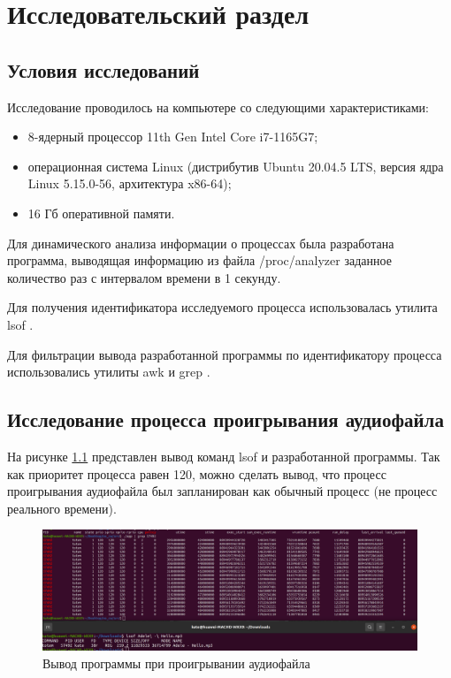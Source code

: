 \chapter{Исследовательский раздел}
\section{Условия исследований}
Исследование проводилось на компьютере со следующими характеристиками:

\begin{itemize}
\item 8-ядерный процессор 11th Gen Intel Core i7-1165G7;
\item операционная система Linux (дистрибутив Ubuntu 20.04.5 LTS, версия ядра Linux 5.15.0-56, архитектура x86-64);
\item 16 Гб оперативной памяти.
\end{itemize}

Для динамического анализа информации о процессах была разработана программа, выводящая информацию из файла /proc/analyzer заданное количество раз с интервалом времени в 1 секунду. 

Для получения идентификатора исследуемого процесса использовалась утилита lsof \cite{bib:2}. 

Для фильтрации вывода разработанной программы по идентификатору процесса использовались утилиты awk и grep \cite{bib:2}.

\section{Исследование процесса проигрывания ау\-диофайла}

На рисунке \ref{audio} представлен вывод команд lsof и разработанной программы. Так как приоритет процесса равен 120, можно сделать вывод, что процесс проигрывания аудиофайла был запланирован как обычный процесс (не процесс реального времени).

\begin{figure}[H]
	\centering
	\includegraphics[width=\linewidth]{img/audio.png}
	\caption{Вывод программы при проигрывании аудиофайла}
	\label{audio}
\end{figure}

